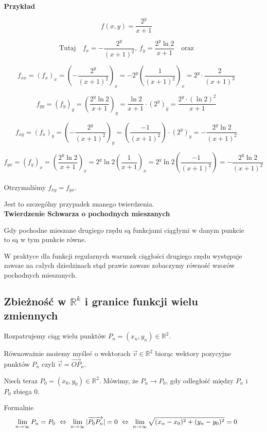 \textbf{Przykład}

$$ f(x,y) = \frac{2^y}{x+1} $$

$$ \textrm{Tutaj} \quad  f_x = -\frac{2^y}{(x+1)^2}, \ f_y = \frac{2^y \ln 2}{x+1} \quad \textrm{oraz} $$

$$ f_{xx} = (f_x)_x = \left( - \frac{2^y}{(x+1)^2} \right)_x = -2^y \left( \frac{1}{(x+1)^2} \right)_x = 2^y \cdot \frac{2}{(x+1)^3} $$

$$ f_{yy} = (f_y)_y = \left( \frac{2^y \ln 2}{x+1} \right)_y = \frac{\ln2}{x+1} \cdot (2^y)_y = \frac{2^y \cdot (\ln2)^2}{x+1} $$

$$ f_{xy} = (f_x)_y = \left( - \frac{2^y}{(x+1)^2} \right)_y = \left( \frac{-1}{(x+1)^2} \right) \cdot (2^y)_y = - \frac{2^y \ln2}{(x+1)^2} $$

$$ f_{yx} = (f_y)_x = \left( \frac{2^y \ln2}{x+1} \right)_x = 2^y \ln2 \left( \frac{1}{x+1} \right)_x = 2^y \ln2 \left( \frac{-1}{(x+1)^2} \right) = - \frac{2^y \ln2}{(x+1)^2} $$ \\

Otrzymaliśmy $ f_{xy} = f_{yx} $.

Jest to szczególny przypadek znanego twierdzenia. \\

\textbf{Twierdzenie Schwarza o pochodnych mieszanych}

Gdy pochodne mieszane drugiego rzędu są funkcjami ciągłymi w danym punkcie to są w tym punkcie równe.

W praktyce dla funkcji regularnych warunek ciągłości drugiego rzędu występuje zawsze na całych dziedzinach
stąd prawie zawsze zobaczymy równość wzorów pochodnych mieszanych.


\subsection*{Zbieżność w $\mathbb{R}^k$ i granice funkcji wielu zmiennych}

Rozpatrujemy ciąg wielu punktów $ P_n = (x_n, y_n) \in \mathbb{R}^2 $.

Równoważnie możemy myśleć o wektorach $ \vec{v} \in \mathbb{R}^2 $ biorąc wektory pozycyjne punktów $P_n$ czyli $\vec{v} = \vec{OP}_n$.

Niech teraz $ P_0 = (x_0, y_0) \in \mathbb{R}^2 $. Mówimy, że $ P_n \to P_0 $, gdy odległość między $P_n$ i $P_0$ zbiega $0$.

Formalnie
$$ \limn P_n = P_0 \ \Leftrightarrow \ \limn |\overrightarrow{P_0 P_n}| = 0
\ \Leftrightarrow \ \limn \sqrt{(x_n - x_0)^2 + (y_n - y_0)^2} = 0 $$

